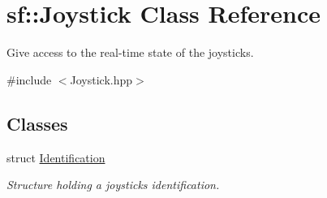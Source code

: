 \hypertarget{classsf_1_1_joystick}{}\section{sf\+:\+:Joystick Class Reference}
\label{classsf_1_1_joystick}


Give access to the real-\/time state of the joysticks.  




{\ttfamily \#include $<$Joystick.\+hpp$>$}

\subsection*{Classes}
\begin{DoxyCompactItemize}
\item 
struct \hyperlink{structsf_1_1_joystick_1_1_identification}{Identification}
\begin{DoxyCompactList}\small\item\em Structure holding a joystick\textquotesingle{}s identification. \end{DoxyCompactList}\end{DoxyCompactItemize}
